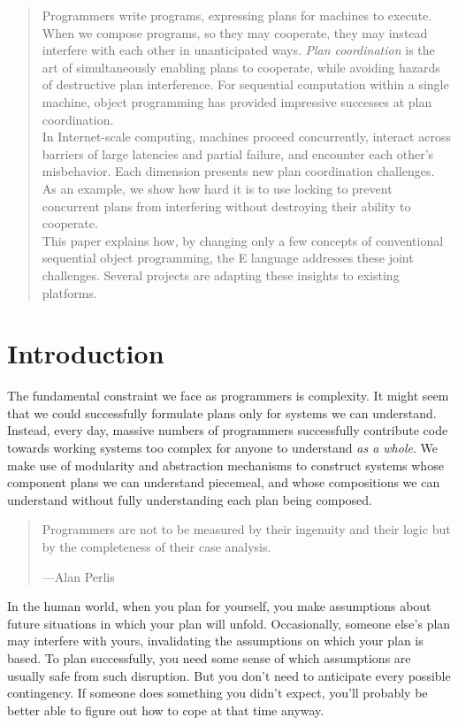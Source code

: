\documentclass{llncs}
\begin{document}
\begin{abstract}
Programmers write programs, expressing plans for machines to
execute. When we compose programs, so they may cooperate, they may
instead interfere with each other in unanticipated ways. \emph{Plan
coordination} is the art of simultaneously enabling plans to
cooperate, while avoiding hazards of destructive plan
interference. For sequential computation within a single machine,
object programming has provided impressive successes at plan
coordination.\\

In Internet-scale computing, machines proceed concurrently, interact
across barriers of large latencies and partial failure, and encounter
each other's misbehavior. Each dimension presents new plan
coordination challenges. As an example, we show how hard it is to use
locking to prevent concurrent plans from interfering without
destroying their ability to cooperate.\\

This paper explains how, by changing only a few concepts of
conventional sequential object programming, the E language addresses
these joint challenges. Several projects are adapting these insights
to existing platforms.
\end{abstract}

\section{Introduction}

The fundamental constraint we face as programmers is complexity. It
might seem that we could successfully formulate plans only for systems
we can understand. Instead, every day, massive numbers of programmers
successfully contribute code towards working systems too complex for
anyone to understand \emph{as a whole}. We make use of modularity and
abstraction mechanisms to construct systems whose component plans we
can understand piecemeal, and whose compositions we can understand
without fully understanding each plan being composed.
%
\begin{quote}
Programmers are not to be measured by their ingenuity and their logic
but by the completeness of their case analysis.
\begin{flushright}
---Alan Perlis
\end{flushright}
\end{quote}
%
In the human world, when you plan for yourself, you make assumptions
about future situations in which your plan will unfold. Occasionally,
someone else's plan may interfere with yours, invalidating the
assumptions on which your plan is based. To plan successfully, you
need some sense of which assumptions are usually safe from such
disruption. But you don't need to anticipate every possible
contingency. If someone does something you didn't expect, you'll
probably be better able to figure out how to cope at that time anyway.
\end{document}
